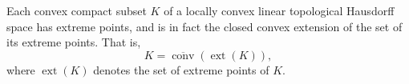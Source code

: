 Each convex compact subset $K$ of a locally convex linear topological Hausdorff space has extreme points, and is in fact the closed convex extension of the set of its extreme points. That is,
$$K = \overline{\operatorname{conv}}(\operatorname{ext}(K)),$$
where $\operatorname{ext}(K)$ denotes the set of extreme points of $K$.
